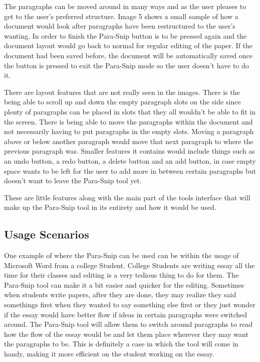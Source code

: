 \documentclass{article}
\begin{document}
{	The paragraphs can be moved around in many ways and as the user pleases to get to the user's preferred structure. Image 5 shows a small sample of how a document would look after paragraphs have been restructured to the user's wanting. In order to finish the Para-Snip button is to be pressed again and the document layout would go back to normal  for regular editing of the paper. If the document had been saved before, the document will be automatically saved once the button is pressed to exit the Para-Snip mode so the user doesn't have to do it.
	
	There are layout features that are not really seen in the images. There is the being able to scroll up and down the empty paragraph slots on the side since plenty of paragraphs can be placed in slots that they all wouldn't be able to fit in the screen. There is being able to move the paragraphs within the document and not necessarily having to put paragraphs in the empty slots. Moving a paragraph above or below another paragraph would move that next paragraph to where the previous paragraph was. Smaller features it contains would include things such as an undo button, a redo button, a delete button and an add button, in case empty space wants to be left for the user to add more in between certain paragraphs but doesn't want to leave the Para-Snip tool yet. 
	
	These are little features along with the main part of the tools interface that will make up the Para-Snip tool in its entirety and how it would be used.
	
\subsection{Usage Scenarios}

	One example of where the Para-Snip can be used can be within the usage of Microsoft Word from a college Student. College Students are writing essay all the time for their classes and editing is a very tedious thing to do for them. The Para-Snip tool can make it a bit easier and quicker for the editing. Sometimes when students write papers, after they are done, they may realize they said somethings first when they wanted to say something else first or they just wonder if the essay would have better flow if ideas in certain paragraphs were switched around. The Para-Snip tool will allow them to switch around paragraphs to read how the flow of the essay would be and let them place wherever they may want the paragraphs to be. This is definitely a case in which the tool will come in handy, making it more efficient on the student working on the essay.
	
}
\end{document}
